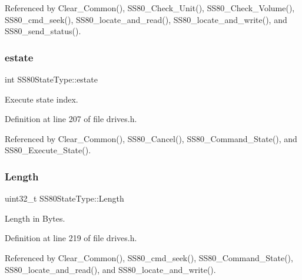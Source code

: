 Referenced by Clear\+\_\+\+Common(), S\+S80\+\_\+\+Check\+\_\+\+Unit(), S\+S80\+\_\+\+Check\+\_\+\+Volume(), S\+S80\+\_\+cmd\+\_\+seek(), S\+S80\+\_\+locate\+\_\+and\+\_\+read(), S\+S80\+\_\+locate\+\_\+and\+\_\+write(), and S\+S80\+\_\+send\+\_\+status().

\mbox{\label{structSS80StateType_ae4a94143cb4201687be4e33684be057e}} 
\subsubsection{\texorpdfstring{estate}{estate}}
{\footnotesize\ttfamily int S\+S80\+State\+Type\+::estate}



Execute state index. 



Definition at line 207 of file drives.\+h.



Referenced by Clear\+\_\+\+Common(), S\+S80\+\_\+\+Cancel(), S\+S80\+\_\+\+Command\+\_\+\+State(), and S\+S80\+\_\+\+Execute\+\_\+\+State().

\mbox{\label{structSS80StateType_a507159f0a0a4f3127488081fd618e8f6}} 
\subsubsection{\texorpdfstring{Length}{Length}}
{\footnotesize\ttfamily uint32\+\_\+t S\+S80\+State\+Type\+::\+Length}



Length in Bytes. 



Definition at line 219 of file drives.\+h.



Referenced by Clear\+\_\+\+Common(), S\+S80\+\_\+cmd\+\_\+seek(), S\+S80\+\_\+\+Command\+\_\+\+State(), S\+S80\+\_\+locate\+\_\+and\+\_\+read(), and S\+S80\+\_\+locate\+\_\+and\+\_\+write().

\mbox{\label{structSS80StateType_ad4911c7b89ec1ff2c0aa01881b1e3d3a}} 
